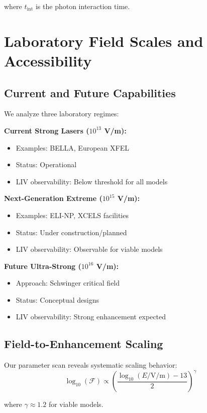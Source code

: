 \documentclass[12pt]{article}
\begin{document}
where $t_{\text{int}}$ is the photon interaction time.

\section{Laboratory Field Scales and Accessibility}

\subsection{Current and Future Capabilities}

We analyze three laboratory regimes:

\textbf{Current Strong Lasers ($10^{13}$ V/m):}
\begin{itemize}
\item Examples: BELLA, European XFEL
\item Status: Operational
\item LIV observability: Below threshold for all models
\end{itemize}

\textbf{Next-Generation Extreme ($10^{15}$ V/m):}
\begin{itemize}
\item Examples: ELI-NP, XCELS facilities
\item Status: Under construction/planned
\item LIV observability: Observable for viable models
\end{itemize}

\textbf{Future Ultra-Strong ($10^{16}$ V/m):}
\begin{itemize}
\item Approach: Schwinger critical field
\item Status: Conceptual designs
\item LIV observability: Strong enhancement expected
\end{itemize}

\subsection{Field-to-Enhancement Scaling}

Our parameter scan reveals systematic scaling behavior:
\begin{equation}
\log_{10}(\mathcal{F}) \propto \left(\frac{\log_{10}(E/\text{V/m}) - 13}{2}\right)^{\gamma}
\end{equation}

where $\gamma \approx 1.2$ for viable models.
\end{document}
